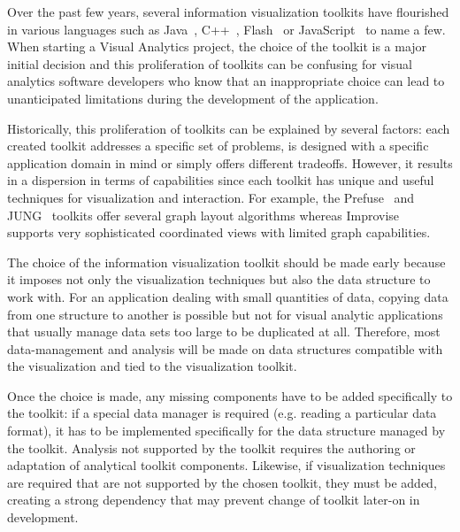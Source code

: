 Over the past few years, several information visualization toolkits
have flourished in various languages such as Java~\cite{InfoVis,
  Prefuse, jung2003, Improvise,Discovery2}, C++~\cite{Tulip,ADVIZOR}, Flash~\cite{Axiis} or
JavaScript~\cite{flare,thejit,Protovis} to name a few.  When starting
a Visual Analytics project, the choice of the toolkit is a major
initial decision and this proliferation of toolkits can be confusing
for visual analytics software developers who know that an
inappropriate choice can lead to unanticipated limitations during the
development of the application.

Historically, this proliferation of toolkits can be explained by
several factors: each created toolkit addresses a specific set of
problems, is designed with a specific application domain in mind or
simply offers different tradeoffs.  However, it results in a dispersion
in terms of capabilities since each toolkit has unique and useful
techniques for visualization and interaction.  For example, the
Prefuse~\cite{Prefuse} and JUNG~\cite{jung2003} toolkits offer several
graph layout algorithms whereas Improvise~\cite{Improvise} supports
very sophisticated coordinated views with limited graph capabilities.

The choice of the information visualization toolkit should be made
early because it imposes not only the visualization techniques but
also the data structure to work with.  For an application dealing with
small quantities of data, copying data from one structure to another
is possible but not for visual analytic applications that usually
manage data sets too large to be duplicated at all.  Therefore, most
data-management and analysis will be made on data structures
compatible with the visualization and tied to the visualization
toolkit.


Once the choice is made, any missing components have to be
added specifically to the toolkit: if a special data manager is
required (e.g. reading a particular data format), it has to be
implemented specifically for the data structure managed by the
toolkit. Analysis not supported by the toolkit requires the authoring
or adaptation of analytical toolkit components. Likewise, if visualization
techniques are required that are not supported by the chosen toolkit,
they must be added, creating a strong dependency that may prevent
change of toolkit later-on in development.

